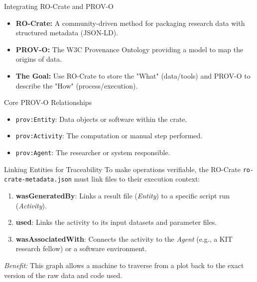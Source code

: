 \documentclass[aspectratio=169]{beamer}
\begin{document}
\begin{frame}{Integrating RO-Crate and PROV-O}
    \begin{itemize}
        \item \textbf{RO-Crate:} A community-driven method for packaging research data with structured metadata (JSON-LD).
        \item \textbf{PROV-O:} The W3C Provenance Ontology providing a model to map the origins of data.
        \item \textbf{The Goal:} Use RO-Crate to store the "What" (data/tools) and PROV-O to describe the "How" (process/execution).
    \end{itemize}
    \vspace{0.3cm}
    \begin{block}{Core PROV-O Relationships}
        \begin{itemize}
            \item \texttt{prov:Entity}: Data objects or software within the crate.
            \item \texttt{prov:Activity}: The computation or manual step performed.
            \item \texttt{prov:Agent}: The researcher or system responsible.
        \end{itemize}
    \end{block}
\end{frame}

\begin{frame}{Linking Entities for Traceability}
    To make operations verifiable, the RO-Crate \texttt{ro-crate-metadata.json} must link files to their execution context:
    \vfill
    \begin{enumerate}
        \item \textbf{wasGeneratedBy}: Links a result file (\textit{Entity}) to a specific script run (\textit{Activity}).
        \item \textbf{used}: Links the activity to its input datasets and parameter files.
        \item \textbf{wasAssociatedWith}: Connects the activity to the \textit{Agent} (e.g., a KIT research fellow) or a software environment.
    \end{enumerate}
    \vfill
    \textit{Benefit:} This graph allows a machine to traverse from a plot back to the exact version of the raw data and code used.
\end{frame}
\end{document}
